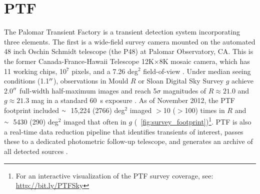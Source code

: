 \documentclass{emulateapj}
\newcommand{\apwsim}{\raisebox{0.2ex}{\scriptsize$\sim$\normalsize}}
\begin{document}

\section{PTF } %
The Palomar Transient Factory is a transient detection system incorporating three elements. The first is a wide-field survey camera mounted on the automated 48 inch Oschin Schmidt telescope (the P48) at Palomar Observatory, CA. This is the former Canada-France-Hawaii Telescope 12K$\times$8K mosaic camera, which has 11 working chips, 10$^7$ pixels, and a 7.26 deg$^2$ field-of-view \citep{rahmer2008}. Under median seeing conditions (1.1$\mbox{$^{\prime\prime}$}$), observations in Mould $R$ or Sloan Digital Sky Survey \citep[SDSS;][]{york00} $g$ achieve 2.0$\mbox{$^{\prime\prime}$}$ full-width half-maximum images and reach 5$\sigma$ magnitudes of $R \approx 21.0$ and $g \approx 21.3$ mag in a standard 60~s exposure \citep{nick2010}. As of November 2012, the PTF footprint included $\apwsim$15,224 (2766) deg$^2$ imaged $>$10 ($>$100) times in $R$ and $\apwsim$5430 (290) deg$^2$ imaged that often in $g$ (\figurename~\ref{fig:survey_footprint})\footnote{For an interactive visualization of the PTF survey coverage, see: \url{http://bit.ly/PTFSky}}. PTF is also a real-time data reduction pipeline that identifies transients of interest, passes these to a dedicated photometric follow-up telescope, and generates an archive of all detected sources \citep{nick2009,rau2009}.
\end{document}
